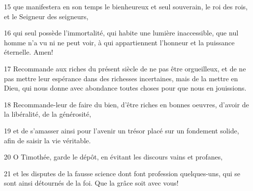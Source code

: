 \par 15 que manifestera en son temps le bienheureux et seul souverain, le roi des rois, et le Seigneur des seigneurs,
\par 16 qui seul possède l'immortalité, qui habite une lumière inaccessible, que nul homme n'a vu ni ne peut voir, à qui appartiennent l'honneur et la puissance éternelle. Amen!
\par 17 Recommande aux riches du présent siècle de ne pas être orgueilleux, et de ne pas mettre leur espérance dans des richesses incertaines, mais de la mettre en Dieu, qui nous donne avec abondance toutes choses pour que nous en jouissions.
\par 18 Recommande-leur de faire du bien, d'être riches en bonnes oeuvres, d'avoir de la libéralité, de la générosité,
\par 19 et de s'amasser ainsi pour l'avenir un trésor placé sur un fondement solide, afin de saisir la vie véritable.
\par 20 O Timothée, garde le dépôt, en évitant les discours vains et profanes,
\par 21 et les disputes de la fausse science dont font profession quelques-uns, qui se sont ainsi détournés de la foi. Que la grâce soit avec vous!


